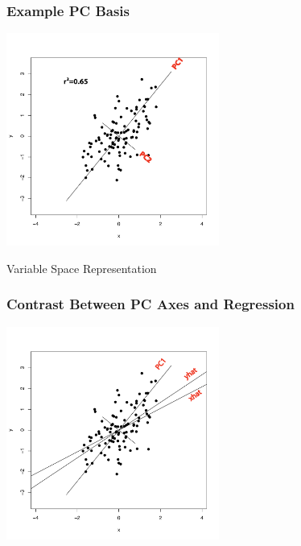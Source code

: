 \documentclass{beamer}
\begin{document}


\begin{frame}
  \frametitle{Example PC Basis}

\begin{center}
\includegraphics[height=2.75in]{pca2d-labeled}
\smallskip

Variable Space Representation

\end{center}  


\end{frame}

\begin{frame}
  \frametitle{Contrast Between PC Axes and Regression}

\begin{center}
\includegraphics[height=2.75in]{pca2d-vs-reg-labeled}
\smallskip

\end{center}  

\end{frame}
\end{document}
